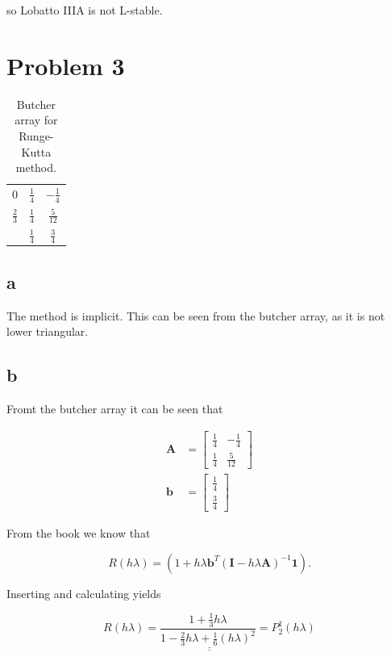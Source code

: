\documentclass{article}
\begin{document}
so Lobatto IIIA is not L-stable.

\section{Problem 3}

\begin{table}
\centering
\begin{tabular}{c|c c}\label{tab:butcher}
    $0$ & $\frac{1}{4}$ & $-\frac{1}{4}$ \\
    $\frac{2}{3}$ & $\frac{1}{4}$ & $\frac{5}{12}$ \\
    \hline
        & $\frac{1}{4}$ & $\frac{3}{4}$
\end{tabular}
\caption{Butcher array for Runge-Kutta method.}
\end{table}

\subsection{a}

The method is implicit. This can be seen from the butcher array, as it is not lower triangular.

\subsection{b}
Fromt the butcher array it can be seen that 

\begin{align*}
    \mathbf{A} &= 
    \begin{bmatrix}
        \frac{1}{4} & -\frac{1}{4} \\
        \frac{1}{4} & \frac{5}{12}
    \end{bmatrix}\\
    \mathbf{b} &= \begin{bmatrix}
        \frac{1}{4} \\
        \frac{3}{4}
    \end{bmatrix}
\end{align*}

From the book we know that 

\begin{equation*}
    R(h\lambda) = (1 + h\lambda\mathbf{b}^T(\mathbf{I} - h\lambda\mathbf{A})^{-1}\mathbf{1}).
\end{equation*}

Inserting and calculating yields

\begin{equation*}
    \underline{\underline{R(h\lambda) = \frac{1 + \frac{1}{3}h\lambda}{1 - \frac{2}{3}h\lambda + \frac{1}{6}(h\lambda)^2} = P_2^1(h\lambda)}}
\end{equation*}
\end{document}
